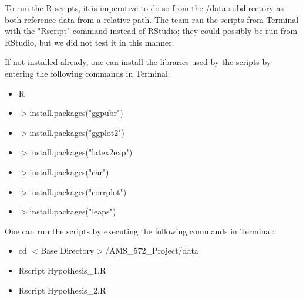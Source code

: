 To run the R scripts, it is imperative to do so from the /data subdirectory as both reference data from a relative path. The team ran the scripts from Terminal with the "Rscript" command instead of RStudio; they could possibly be run from RStudio, but we did not test it in this manner.

If not installed already, one can install the libraries used by the scripts by entering the following commands in Terminal:

\begin{itemize}
	\item R
	\item $>$install.packages("ggpubr")
	\item $>$install.packages("ggplot2")
	\item $>$install.packages("latex2exp")
	\item $>$install.packages("car")
	\item $>$install.packages("corrplot")
	\item $>$install.packages("leaps")
\end{itemize}

One can run the scripts by executing the following commands in Terminal:

\begin{itemize}
	\item cd $<$Base Directory$>$/AMS\_572\_Project/data
	\item Rscript Hypothesis\_1.R
	\item Rscript Hypothesis\_2.R
\end{itemize}
